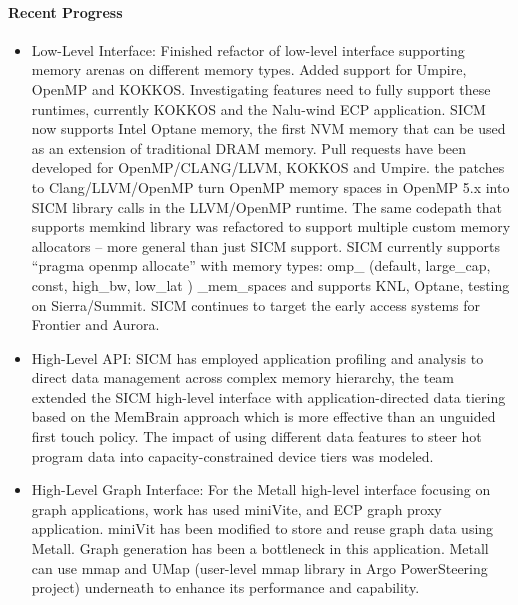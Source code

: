 \paragraph{Recent Progress} \leavevmode 
\begin{itemize}
	\item  Low-Level Interface: Finished refactor of low-level interface supporting memory arenas on different memory types. Added support for Umpire, OpenMP and KOKKOS. Investigating features need to fully support these runtimes, currently KOKKOS and the Nalu-wind ECP application. SICM now supports Intel Optane memory, the first NVM memory that can be used as an extension of traditional DRAM memory.
	Pull requests have been developed for OpenMP/CLANG/LLVM, KOKKOS and Umpire. the patches to Clang/LLVM/OpenMP turn OpenMP memory spaces in OpenMP 5.x into SICM library calls in the LLVM/OpenMP runtime. The same codepath that supports memkind library was refactored to support multiple custom memory allocators – more general than just SICM support.
	SICM currently supports ``pragma openmp allocate'' with  memory types: omp\_ (default, large\_cap, const, high\_bw, low\_lat ) \_mem\_spaces and supports KNL, Optane, testing on Sierra/Summit.  SICM continues to target the early access systems for Frontier and Aurora.
	\item High-Level API: SICM has employed application profiling and analysis to direct data management across complex memory hierarchy, the team extended the SICM high-level interface with application-directed data tiering based on the MemBrain approach which is more effective than an unguided first touch policy.  The impact of using different data features to steer hot program data into capacity-constrained device tiers was modeled.
	\item  High-Level Graph Interface: For the Metall high-level interface focusing on graph applications, work has used miniVite, and ECP graph proxy application. miniVit has been modified to store and reuse graph data using Metall.  Graph generation has been a bottleneck in this application. Metall can use mmap and UMap (user-level mmap library in Argo PowerSteering project) underneath to enhance its performance and capability.
\end{itemize}

